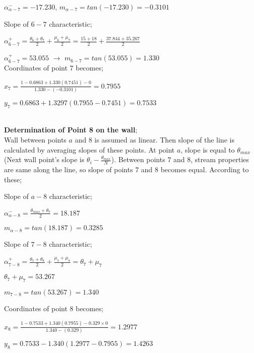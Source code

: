 \begin{appendices}
${\alpha}_{\alpha-7}^{-} = -17.230 $,   $m_{\alpha-7} = tan(-17.230) = -0.3101$

Slope of $6-7$ characteristic;

${\alpha}^{+}_{6-7} = \frac{\theta_6+\theta_7}{2}+\frac{\mu_6+\mu_7}{2} = \frac{15+18}{2}+\frac{37.844+35.267}{2}$

${\alpha}_{6-7}^{+} = 53.055 $ $\rightarrow$   $m_{6-7} = tan(53.055) = 1.330$\\

Coordinates of point $7$ becomes;\\

{\color{magenta}
	$x_7 = \frac{1-0.6863+1.330(0.7451)-0}{1.330-(-0.3101)} = 0.7955 $
	
	$y_7 = 0.6863+1.3297(0.7955-0.7451)=0.7533$
}\\

\noindent\textbf{Determination of Point 8 on the wall};\\

\noindent Wall between points $a$ and $8$ is assumed as linear. Then slope of the line is calculated by averaging slopes of these points. At point $a$, slope is equal to $\theta_{max}$ (Next wall point's slope is $\theta_{i}-\frac{\theta_{max}}{N}$). Between points $7$ and $8$, stream properties are same along the line, so slope of points $7$ and $8$ becomes equal. According to these;

\begin{multicols}{2}
	Slope of $a-8$ characteristic;
	
	${\alpha}^{-}_{\alpha-8} = \frac{\theta_{max}+\theta_7}{2} =18.187 $
	
	$m_{\alpha-8} = tan(18.187) = 0.3285$
	
	\columnbreak
	
	Slope of $7-8$ characteristic;
	
	${\alpha}^{+}_{7-8} = \frac{\theta_7+\theta_8}{2}+\frac{\mu_7+\mu_8}{2} = \theta_7+\mu_7$
	
	$\theta_7+\mu_7=53.267$
	
	$m_{7-8} = tan(53.267) = 1.340$
\end{multicols}

\pagebreak

Coordinates of point $8$ becomes;\\

{\color{magenta}
	$x_8 = \frac{1-0.7533+1.340(0.7955)-0.329\times0}{1.340-(0.329)} = 1.2977 $
	
	$y_8 = 0.7533-1.340(1.2977-0.7955)=1.4263$
}\\


\end{appendices}
